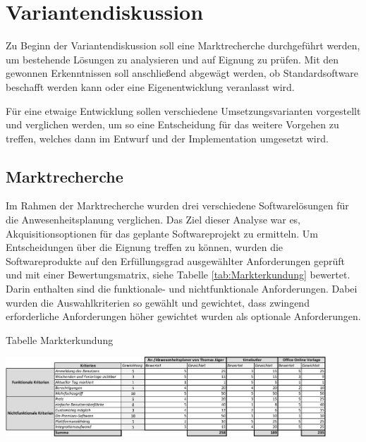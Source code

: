 \section{Variantendiskussion}
\label{sec:Variantendiskussion}
Zu Beginn der Variantendiskussion soll eine Marktrecherche durchgeführt werden, um bestehende Lösungen zu analysieren und auf Eignung zu prüfen. Mit den gewonnen Erkenntnissen soll anschließend abgewägt werden, ob Standardsoftware beschafft werden kann oder eine Eigenentwicklung veranlasst wird.

Für eine etwaige Entwicklung sollen verschiedene Umsetzungsvarianten vorgestellt und verglichen werden, um so eine Entscheidung für das weitere Vorgehen zu treffen, welches dann im Entwurf und der Implementation umgesetzt wird.

\subsection{Marktrecherche}
\label{sec:Marktrecherche}
Im Rahmen der Marktrecherche wurden drei verschiedene Softwarelösungen für die Anwesenheitsplanung verglichen. Das Ziel dieser Analyse war es, Akquisitionsoptionen für das geplante Softwareprojekt zu ermitteln. Um Entscheidungen über die Eignung treffen zu können, wurden die Softwareprodukte auf den Erfüllungsgrad ausgewählter Anforderungen geprüft und mit einer Bewertungsmatrix, siehe Tabelle \ref{tab:Markterkundung} bewertet. Darin enthalten sind die funktionale- und nichtfunktionale Anforderungen. Dabei wurden die Auswahlkriterien so gewählt und gewichtet, dass zwingend erforderliche Anforderungen höher gewichtet wurden als optionale Anforderungen.

\begin{table}[htbp]
    \centering
    \caption[Vergleichstabelle Markterkundung]{Tabelle Markterkundung}
    \includegraphics[width=0.9\textwidth,angle=0]{abb/Markterkundung.pdf}
    \label{tab:Markterkundung}
\end{table}

